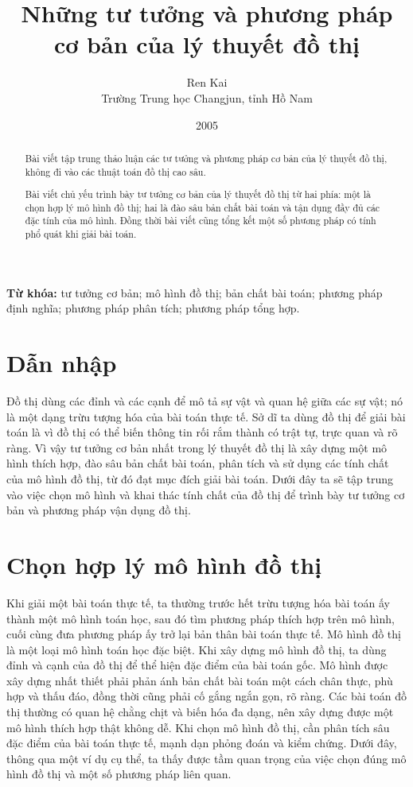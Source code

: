 \documentclass[11pt]{article}
\title{Những tư tưởng và phương pháp cơ bản của lý thuyết đồ thị}
\author{Ren Kai\\Trường Trung học Changjun, tỉnh Hồ Nam}
\date{2005}
\begin{document}
\maketitle


\renewcommand{\abstractname}{Tóm tắt}
\begin{abstract}
Bài viết tập trung thảo luận các tư tưởng và phương pháp cơ bản của lý thuyết
đồ thị, không đi vào các thuật toán đồ thị cao sâu.

Bài viết chủ yếu trình bày tư tưởng cơ bản của lý thuyết đồ thị từ hai phía:
một là chọn hợp lý mô hình đồ thị; hai là đào sâu bản chất bài toán và tận
dụng đầy đủ các đặc tính của mô hình. Đồng thời bài viết cũng tổng kết một số
phương pháp có tính phổ quát khi giải bài toán.
\end{abstract}

\noindent\textbf{Từ khóa:} tư tưởng cơ bản; mô hình đồ thị; bản chất bài toán;
phương pháp định nghĩa; phương pháp phân tích; phương pháp tổng hợp.

\section{Dẫn nhập}

Đồ thị dùng các đỉnh và các cạnh để mô tả sự vật và quan hệ giữa các sự vật;
nó là một dạng trừu tượng hóa của bài toán thực tế. Sở dĩ ta dùng đồ thị để
giải bài toán là vì đồ thị có thể biến thông tin rối rắm thành có trật tự, trực
quan và rõ ràng. Vì vậy tư tưởng cơ bản nhất trong lý thuyết đồ thị là xây
dựng một mô hình thích hợp, đào sâu bản chất bài toán, phân tích và sử dụng các
tính chất của mô hình đồ thị, từ đó đạt mục đích giải bài toán. Dưới đây ta sẽ
tập trung vào việc chọn mô hình và khai thác tính chất của đồ thị để trình bày
tư tưởng cơ bản và phương pháp vận dụng đồ thị.

\section{Chọn hợp lý mô hình đồ thị}

Khi giải một bài toán thực tế, ta thường trước hết trừu tượng hóa bài toán ấy
thành một mô hình toán học, sau đó tìm phương pháp thích hợp trên mô hình, cuối
cùng đưa phương pháp ấy trở lại bản thân bài toán thực tế. Mô hình đồ thị là
một loại mô hình toán học đặc biệt. Khi xây dựng mô hình đồ thị, ta dùng đỉnh
và cạnh của đồ thị để thể hiện đặc điểm của bài toán gốc. Mô hình được xây
dựng nhất thiết phải phản ánh bản chất bài toán một cách chân thực, phù hợp và
thấu đáo, đồng thời cũng phải cố gắng ngắn gọn, rõ ràng. Các bài toán đồ thị
thường có quan hệ chằng chịt và biến hóa đa dạng, nên xây dựng được một mô
hình thích hợp thật không dễ. Khi chọn mô hình đồ thị, cần phân tích sâu đặc
điểm của bài toán thực tế, mạnh dạn phỏng đoán và kiểm chứng. Dưới đây, thông
qua một ví dụ cụ thể, ta thấy được tầm quan trọng của việc chọn đúng mô hình đồ
thị và một số phương pháp liên quan.
\end{document}
